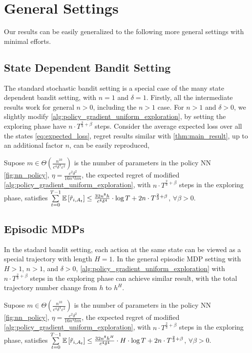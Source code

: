 \section{General Settings}
\label{sec:general_settings}

Our results can be easily generalized to the following more general settings with minimal efforts.

\subsection{State Dependent Bandit Setting}

The standard stochastic bandit setting is a special case of the many state dependent bandit setting, with $n = 1$ and $\delta = 1$. Firstly, all the intermediate results work for general $n > 0$, including the $n > 1$ case.
For $n > 1$ and $\delta > 0$, we slightly modify \cref{alg:policy_gradient_uniform_exploration}, by setting the exploring phase have $n \cdot T^{\frac{2}{3} + \beta}$ steps. Consider the average expected loss over all the states \cref{eq:expected_loss}, regret results similar with \cref{thm:main_result}, up to an additional factor $n$, can be easily reproduced,
\begin{thm}
\label{thm:many_state_dependent_bandit_setting}
     Supose $m \in \Theta\left( \frac{n^{10}}{c^4 \delta^4 \varepsilon^2} \right)$ is the number of parameters in the policy NN \cref{fig:nn_policy}, $\eta = \frac{c^2 \delta^2}{16 n^4 h m}$, the expected regret of modified \cref{alg:policy_gradient_uniform_exploration}, with $n \cdot T^{\frac{2}{3}+\beta}$ steps in the exploring phase, satisfies $\sum\limits_{t=0}^{T-1}{ {\mathbb{E}} \left[ \tilde{r}_{i, A_t} \right] } \le  \frac{32n^8h}{ c^4 \delta^4} \cdot \log{T} + 2n \cdot T^{\frac{2}{3} + \beta }$, $\forall \beta > 0$.
\end{thm}

\subsection{Episodic MDPs}

In the stadard bandit setting, each action at the same state can be viewed as a special trajectory with length $H = 1$. In the general episodic MDP setting with $H > 1$, $n > 1$, and $\delta > 0$, \cref{alg:policy_gradient_uniform_exploration} with $n \cdot T^{\frac{2}{3}+\beta}$ steps in the exploring phase can achieve similar result, with the total trajectory number change from $h$ to $h^H$.
\begin{thm}
\label{thm:episodic_mdp_setting}
     Supose $m \in \Theta\left( \frac{n^{10}}{c^4 \delta^4 \varepsilon^2} \right)$ is the number of parameters in the policy NN \cref{fig:nn_policy}, $\eta = \frac{c^2 \delta^2}{16 n^4 h m}$, the expected regret of modified \cref{alg:policy_gradient_uniform_exploration}, with $n \cdot T^{\frac{2}{3}+\beta}$ steps in the exploring phase, satisfies $\sum\limits_{t=0}^{T-1}{ {\mathbb{E}} \left[ \tilde{r}_{i, A_t} \right] } \le  \frac{32n^8h^H}{ c^4 \delta^4} \cdot H \cdot \log{T} + 2n \cdot T^{\frac{2}{3} + \beta }$, $\forall \beta > 0$.
\end{thm}

